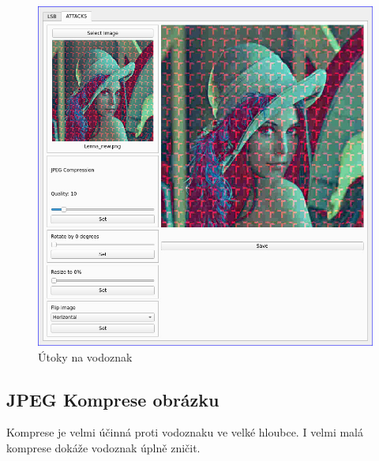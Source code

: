 \begin{figure}[h!]
    \begin{center}
        \includegraphics[scale=0.4]{images/attacks.jpg}
        \caption{Útoky na vodoznak}
    \end{center}
\end{figure}

\subsection[jpeg]{JPEG Komprese obrázku}
Komprese je velmi účinná proti vodoznaku ve velké hloubce. I velmi malá komprese dokáže vodoznak úplně zničit.

